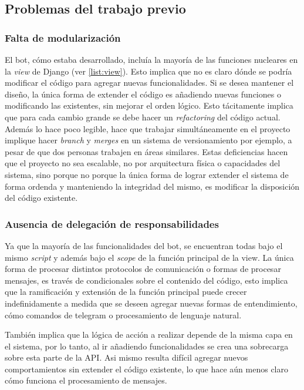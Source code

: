     \subsection{Problemas del trabajo previo}
        \subsubsection{Falta de modularización}
            \par El bot, cómo estaba desarrollado, incluía la mayoría de las funciones nucleares en la \textit{view} de \gls{Django} (ver \ref{list:view}). Esto implica que no es claro dónde se podría modificar el código para agregar nuevas funcionalidades. Si se desea mantener el diseño, la única forma de extender el código es añadiendo nuevas funciones o modificando las existentes, sin mejorar el orden lógico. Esto tácitamente implica que para cada cambio grande se debe hacer un \textit{refactoring} del código actual. Además lo hace poco legible, hace que trabajar simultáneamente en el proyecto implique hacer \textit{branch} y \textit{merges} en un sistema de versionamiento por ejemplo, a pesar de que dos personas trabajen en áreas similares. Estas deficiencias hacen que el proyecto no sea escalable, no por arquitectura física o capacidades del sistema, sino porque no porque la única forma de lograr extender el sistema de forma ordenda y manteniendo la integridad del mismo, es modificar la disposición del código existente. 
            
        \subsubsection{Ausencia de delegación de responsabilidades}
            \par Ya que la mayoría de las funcionalidades del bot, se encuentran todas bajo el mismo \textit{script} y además bajo el \textit{scope} de la función principal de la view. La única forma de procesar distintos protocolos de comunicación o formas de procesar mensajes, es través de condicionales sobre el contenido del código, esto implica que la ramificación y extensión de la función principal puede crecer indefinidamente a medida que se deseen agregar nuevas formas de entendimiento, cómo comandos de telegram o procesamiento de lenguaje natural.
            \par También implica que la lógica de acción a realizar depende de la misma capa en el sistema, por lo tanto, al ir añadiendo funcionalidades se crea una sobrecarga sobre esta parte de la API. Asi mismo resulta difícil agregar nuevos comportamientos sin extender el código existente, lo que hace aún menos claro cómo funciona el procesamiento de mensajes.
